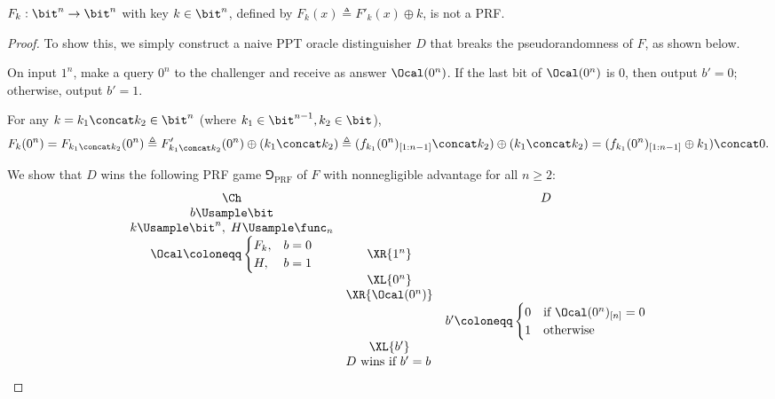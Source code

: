 \begin{answer}[c]
    \begin{claim}
        $F_k:\bit^n\to \bit^n$ with key $k\in\bit^n$, defined by $F_k(x)\triangleq F'_k(x)\oplus k$, is not a PRF.
    \end{claim}
    \begin{proof}
        To show this, we simply construct a naive PPT oracle distinguisher $D$ that breaks the pseudorandomness of $F$, as shown below.
        \begin{mdframed}[style=simplebox]
            On input $1^n$, make a query $0^n$ to the challenger and receive as answer $\Ocal(0^n)$. If the last bit of $\Ocal(0^n)$ is $0$, then output $b'=0$; otherwise, output $b'=1$.
        \end{mdframed}
        \begin{observation}\label{obs:p2-3-1}
            For any $k=k_1\concat k_2 \in\bit^n$ (where $k_1\in\bit^{n-1}, k_2\in\bit$),
            \[F_{k}(0^n) = F_{k_1\concat k_2}(0^n)\triangleq F'_{k_1\concat k_2}(0^n)\oplus (k_1\concat k_2) \triangleq (f_{k_1}(0^n)_{[1:n-1]} \concat k_2) \oplus (k_1\concat k_2) = (f_{k_1}(0^n)_{[1:n-1]}\oplus k_1)\concat 0.\]
        \end{observation}
        We show that $D$ wins the following PRF game $\Game_{\textrm{PRF}}$ of $F$ with nonnegligible advantage for all $n\ge 2$:
        {
            \[
                \begin{array}{@{} c c c @{}}
                \Ch & & D \\
                b\Usample\bit & & \\
                k\Usample\bit^{n},\; H\Usample \func_n & &\\
                \Ocal \coloneqq \begin{cases}
                    F_{k}, &b=0\\
                    H, &b=1
                \end{cases} & \XR{1^n} &\\
                & \XL{0^n} & \\
                & \XR{\Ocal(0^n)} & \\
                & & b'\coloneqq \begin{cases}
                    0 &\textrm{if } \Ocal(0^n)_{[n]}=0\\
                    1 &\textrm{otherwise}
                \end{cases} \\
                & \XL{b'} & \\
                \multicolumn{3}{c}{\text{$D$ wins if $b' = b$}}

\end{array}\]}
\end{proof}
\end{answer}
